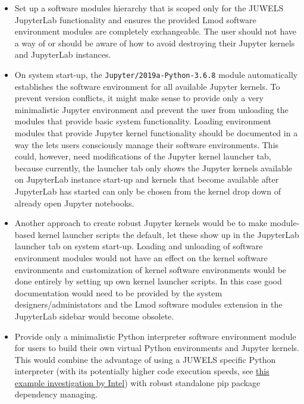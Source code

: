 \begin{itemize}

  \item Set up a software modules hierarchy that is scoped only for the JUWELS JupyterLab functionality and ensures the provided Lmod software environment modules are completely exchangeable.
  The user should not have a way of or should be aware of how to avoid  destroying their Jupyter kernels and JupyterLab instances.

  \item On system start-up, the \verb|Jupyter/2019a-Python-3.6.8| module automatically establishes the software environment for all available Jupyter kernels.
  To prevent version conflicts, it might make sense to provide only a very minimalistic Jupyter environment and prevent the user from unloading the modules that provide basic system functionality.
  Loading environment modules that provide Jupyter kernel functionality should be documented in a way the lets users consciously manage their software environments.
  This could, however, need modifications of the Jupyter kernel launcher tab, because currently, the launcher tab only shows the Jupyter kernels available on JupyterLab instance start-up and kernels that become available after JupyterLab has started can only be chosen from the kernel drop down of already open Jupyter notebooks.

  \item Another approach to create robust Jupyter kernels would be to make module-based kernel launcher scripts the default, let these show up in the JupyterLab launcher tab on system start-up.
  Loading and unloading of software environment modules would not have an effect on the kernel software environments and customization of kernel software environments would be done entirely by setting up own kernel launcher scripts.
  In this case good documentation would need to be provided by the system designers/administators and the Lmod software modules extension in the JupyterLab sidebar would become obsolete.

  \item Provide only a minimalistic Python interpreter software environment module for users to build their own virtual Python environments and Jupyter kernels.
  This would combine the advantage of using a JUWELS specific Python interpreter (with its potentially higher code execution speeds, see \href{https://www.fz-juelich.de/SharedDocs/Downloads/IAS/JSC/EN/slides/supercomputer-ressources-2019-11/15a-tuning_intel.html}{this example investigation by Intel}) with robust standalone pip package dependency managing.


\end{itemize}
